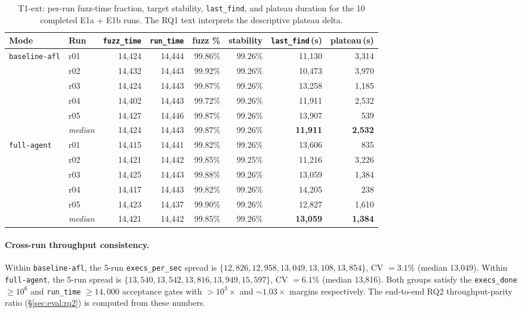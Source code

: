 \documentclass[11pt]{article}
\begin{document}
\begin{table}[t]
  \centering
  \footnotesize
  \setlength{\tabcolsep}{6pt}
  \begin{tabular}{@{}llrrrrrr@{}}
    \toprule
    Mode & Run & \texttt{fuzz\_time} & \texttt{run\_time} & fuzz \% & stability & \texttt{last\_find}\,(s) & plateau\,(s) \\
    \midrule
    \multirow{6}{*}{\texttt{baseline-afl}}
       & r01 & 14{,}424 & 14{,}444 & 99.86\% & 99.26\% & 11{,}130 & 3{,}314 \\
       & r02 & 14{,}432 & 14{,}443 & 99.92\% & 99.26\% & 10{,}473 & 3{,}970 \\
       & r03 & 14{,}424 & 14{,}443 & 99.87\% & 99.26\% & 13{,}258 & 1{,}185 \\
       & r04 & 14{,}402 & 14{,}443 & 99.72\% & 99.26\% & 11{,}911 & 2{,}532 \\
       & r05 & 14{,}427 & 14{,}446 & 99.87\% & 99.26\% & 13{,}907 & \phantom{0}\phantom{,}539 \\
       & \emph{median} & 14{,}424 & 14{,}443 & 99.87\% & 99.26\% & \textbf{11{,}911} & \textbf{2{,}532} \\
    \midrule
    \multirow{6}{*}{\texttt{full-agent}}
       & r01 & 14{,}415 & 14{,}441 & 99.82\% & 99.26\% & 13{,}606 & \phantom{0}\phantom{,}835 \\
       & r02 & 14{,}421 & 14{,}442 & 99.85\% & 99.25\% & 11{,}216 & 3{,}226 \\
       & r03 & 14{,}425 & 14{,}443 & 99.88\% & 99.26\% & 13{,}059 & 1{,}384 \\
       & r04 & 14{,}417 & 14{,}443 & 99.82\% & 99.26\% & 14{,}205 & \phantom{0}\phantom{,}238 \\
       & r05 & 14{,}423 & 14{,}437 & 99.90\% & 99.26\% & 12{,}827 & 1{,}610 \\
       & \emph{median} & 14{,}421 & 14{,}442 & 99.85\% & 99.26\% & \textbf{13{,}059} & \textbf{1{,}384} \\
    \bottomrule
  \end{tabular}
  \caption{T1-ext: per-run fuzz-time fraction, target stability,
  \texttt{last\_find}, and plateau duration for the 10 completed
  E1a + E1b runs. The RQ1 text interprets the descriptive plateau
  delta.}
  \label{tab:t1-ext}
\end{table}

\paragraph{Cross-run throughput consistency.}
Within \texttt{baseline-afl}, the 5-run \texttt{execs\_per\_sec}
spread is $\{12{,}826, 12{,}958, 13{,}049, 13{,}108, 13{,}854\}$,
CV $= 3.1\%$ (median 13{,}049). Within \texttt{full-agent}, the
5-run spread is
$\{13{,}540, 13{,}542, 13{,}816, 13{,}949, 15{,}597\}$,
CV $= 6.1\%$ (median 13{,}816). Both groups satisfy the
\texttt{execs\_done} $\geq 10^6$ and \texttt{run\_time} $\geq 14{,}000$
acceptance gates with $> 10^3\times$ and $\sim 1.03\times$ margins
respectively. The end-to-end RQ2 throughput-parity ratio
(\S\ref{sec:eval:rq2}) is computed from these numbers.
\end{document}

